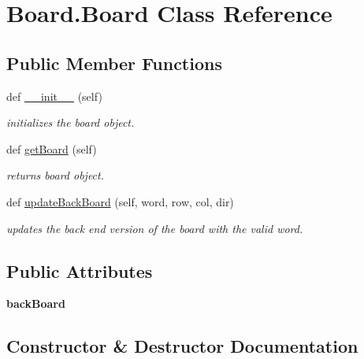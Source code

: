 \hypertarget{class_board_1_1_board}{}\section{Board.\+Board Class Reference}
\label{class_board_1_1_board}
\subsection*{Public Member Functions}
\begin{DoxyCompactItemize}
\item 
def \hyperlink{class_board_1_1_board_ab3b70b36f866ec130f9d8d6af9976308}{\+\_\+\+\_\+init\+\_\+\+\_\+} (self)
\begin{DoxyCompactList}\small\item\em initializes the board object. \end{DoxyCompactList}\item 
def \hyperlink{class_board_1_1_board_abc0eb8a2cc667bb79692d7a31cb8d508}{get\+Board} (self)
\begin{DoxyCompactList}\small\item\em returns board object. \end{DoxyCompactList}\item 
def \hyperlink{class_board_1_1_board_a289e0125aa7d2bf892c142bf1c46021b}{update\+Back\+Board} (self, word, row, col, dir)
\begin{DoxyCompactList}\small\item\em updates the back end version of the board with the valid word. \end{DoxyCompactList}\end{DoxyCompactItemize}
\subsection*{Public Attributes}
\begin{DoxyCompactItemize}
\item 
\mbox{\label{class_board_1_1_board_a03589990954f0bfc80e34cc63c267e76}} 
{\bfseries back\+Board}
\end{DoxyCompactItemize}


\subsection{Constructor \& Destructor Documentation}
\mbox{\label{class_board_1_1_board_ab3b70b36f866ec130f9d8d6af9976308}} 
